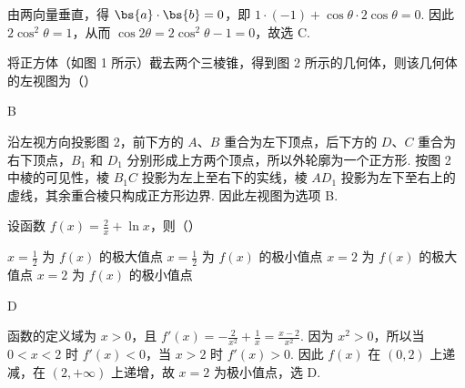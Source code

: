 \begin{solution}
由两向量垂直，得 \(\bs{a}\cdot\bs{b}=0\)，即 \(1\cdot(-1)+\cos\theta\cdot2\cos\theta=0\). 因此 \(2\cos^2\theta=1\)，从而 \(\cos2\theta=2\cos^2\theta-1=0\)，故选 C.
\end{solution}

\begin{problem}
将正方体（如图 1 所示）截去两个三棱锥，得到图 2 所示的几何体，则该几何体的左视图为（\quad）

\begin{minipage}{\linewidth}
\centering
{}
\end{minipage}

    {}
    {}
    {}
\end{problem}

\begin{answer}
B
\end{answer}

\begin{solution}
沿左视方向投影图 2，前下方的 \(A\)、\(B\) 重合为左下顶点，后下方的 \(D\)、\(C\) 重合为右下顶点，\(B_1\) 和 \(D_1\) 分别形成上方两个顶点，所以外轮廓为一个正方形. 按图 2 中棱的可见性，棱 \(B_1C\) 投影为左上至右下的实线，棱 \(AD_1\) 投影为左下至右上的虚线，其余重合棱只构成正方形边界. 因此左视图为选项 B.
\end{solution}

\begin{problem}
设函数 \(f(x) = \frac{2}{x} + \ln x\)，则（\quad）

\choices
    {\(x = \frac{1}{2}\) 为 \(f(x)\) 的极大值点}
    {\(x = \frac{1}{2}\) 为 \(f(x)\) 的极小值点}
    {\(x = 2\) 为 \(f(x)\) 的极大值点}
    {\(x = 2\) 为 \(f(x)\) 的极小值点}
\end{problem}

\begin{answer}
D
\end{answer}

\begin{solution}
函数的定义域为 \(x>0\)，且 \(f'(x)=-\frac{2}{x^2}+\frac{1}{x}=\frac{x-2}{x^2}\). 因为 \(x^2>0\)，所以当 \(0<x<2\) 时 \(f'(x)<0\)，当 \(x>2\) 时 \(f'(x)>0\). 因此 \(f(x)\) 在 \((0,2)\) 上递减，在 \((2,+\infty)\) 上递增，故 \(x=2\) 为极小值点，选 D.
\end{solution}

